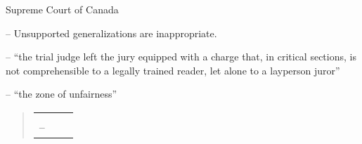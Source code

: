 \newenvironment{myquotation}
{
\vspace{2.1ex}
\begin{quotation}
}
{\end{quotation}
\vspace{2.8ex}
 }


\newenvironment{casenote}[1]
{
\begin{tcolorbox}[title=#1,
enhanced,
attach boxed title to top right,
boxed title style={colframe=blue!75!yellow!15,colback=violet!75,},
colback=red!5!white,
colframe=red!75!black,
fonttitle=\bfseries,
]
}
{\end{tcolorbox}
 }
\newenvironment{casequote}[1]
{
\begin{myquotation}
\begin{tcolorbox}[title=#1,
enhanced,
attach boxed title to top right,
boxed title style={colframe=blue!75!yellow!15,colback=violet!8,},
colback=brown!5!white,
colframe=brown!75!black,
fonttitle=\bfseries,
coltitle=green!25!black,
]\begin{tabular}{ccc}\cellcolor{yellow!30!brown!18}{\Large ``} & \cellcolor{brown!12!white}
\begin{minipage}{0.82\textwidth}
}
{\end{minipage} & \cellcolor{yellow!30!brown!18}{\Large''}\\\end{tabular}\end{tcolorbox}
\end{myquotation}
 }






\p Supreme Court of Canada

-- Unsupported generalizations are inappropriate.

-- ``the trial judge left the jury equipped with a charge that, in critical sections, is not comprehensible to a legally trained reader, let alone to a layperson juror''

-- ``the zone of unfairness''

\begin{casequote}{Access}Access to justice depends on the efficient and responsible use of court resources. Frivolous lawsuits, endless procedural delays, and unnecessary appeals increase the time and expense of litigation and waste these resources. To preserve meaningful access, courts must ensure that their resources remain available to the litigants who need them most — namely, those who advance meritorious and justiciable claims that warrant judicial attention. \\[0.8\baselineskip]
-- \lcinline[1]{ccd}
\end{casequote}

